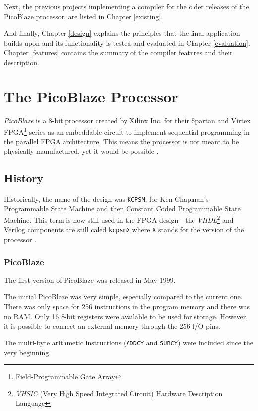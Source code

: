     Next, the previous projects implementing a compiler for the older releases of the PicoBlaze processor, are listed in Chapter \ref{existing}.

    And finally, Chapter \ref{design} explains the principles that the final application builds upon and its functionality is tested and evaluated in Chapter \ref{evaluation}. Chapter \ref{features} contains the summary of the compiler features and their description.

\chapter{The PicoBlaze Processor}\label{processor}

\emph{PicoBlaze} is a 8-bit processor created by Xilinx Inc. for their Spartan and Virtex FPGA\footnote{Field-Programmable Gate Array} series as an embeddable circuit to implement sequential programming in the parallel FPGA architecture. This means the processor is not meant to be physically manufactured, yet it would be possible \cite{PicoBlazeWeb}.

    \section{History}

    Historically, the name of the design was \texttt{KCPSM}, for Ken Chapman's Programmable State Machine and then Constant Coded Programmable State Machine. This term is now still used in the FPGA design - the \emph{VHDL}\footnote{\emph{VHSIC} (Very High Speed Integrated Circuit) Hardware Description Language} and Verilog components are still caled \texttt{kcpsmX} where \texttt{X} stands for the version of the processor \cite{DSPwFPGA}.

        \subsection{PicoBlaze}

        The first version of PicoBlaze was released in May 1999.

        The initial PicoBlaze was very simple, especially compared to the current one. There was only space for 256 instructions in the program memory and there was no RAM. Only 16 8-bit registers were available to be used for storage. However, it is possible to connect an external memory through the 256 I/O pins.

        The multi-byte arithmetic instructions (\texttt{ADDCY} and \texttt{SUBCY}) were included since the very beginning.


